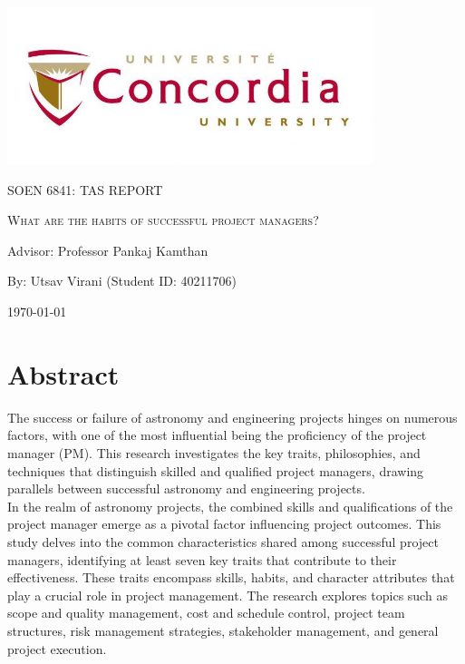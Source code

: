 \documentclass{article}
\begin{document}
\begin{titlepage}
    \centering
    \includegraphics[width=0.8\textwidth]{image.jpeg}\par %
     \vspace{2cm}
    {\scshape\Large SOEN 6841: TAS REPORT \par}
    \vspace{1.5cm}
    {\scshape\Huge What are the habits of successful project managers?\par}
    \vspace{1.5cm}
    \vspace{1.5cm}
    {\large Advisor: Professor Pankaj Kamthan\par}
    \vspace{1.5cm}
    {\large By: Utsav Virani (Student ID: 40211706)\par}
    \vspace{1cm}
    {\large \today\par}
\end{titlepage}

\tableofcontents

\newpage

\section{Abstract}
The success or failure of astronomy and engineering projects hinges on numerous factors, with one of the most influential being the proficiency of the project manager (PM). This research investigates the key traits, philosophies, and techniques that distinguish skilled and qualified project managers, drawing parallels between successful astronomy and engineering projects\cite{Warner_Mark}.\\

In the realm of astronomy projects, the combined skills and qualifications of the project manager emerge as a pivotal factor influencing project outcomes. This study delves into the common characteristics shared among successful project managers, identifying at least seven key traits that contribute to their effectiveness. These traits encompass skills, habits, and character attributes that play a crucial role in project management. The research explores topics such as scope and quality management, cost and schedule control, project team structures, risk management strategies, stakeholder management, and general project execution.\\
\end{document}
